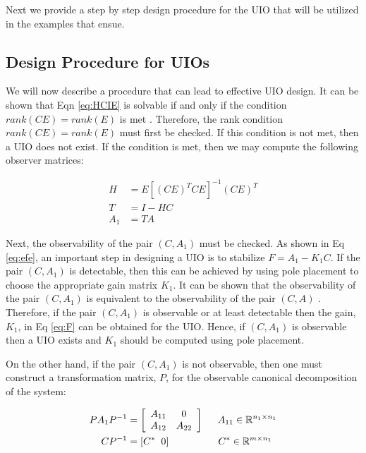 \documentclass{amsart}
\theoremstyle{definition}
\theoremstyle{remark}
\numberwithin{equation}{section}
\begin{document}
Next we provide a step by step design procedure for the UIO that will be utilized in the examples that ensue.
\subsection{Design Procedure for UIOs}
\label{sec: UIODesign}

We will now describe a procedure that can lead to effective UIO design.  It can be shown that Eqn \ref{eq:HCIE} is solvable if and only if the condition $rank(CE) = rank(E)$ is met \cite{Chen99}. Therefore, the rank condition  $rank(CE) = rank(E)$ must first be checked. If this condition is not met, then a UIO does not exist.  If the condition is met, then we may compute the following observer matrices:

\begin{center}
\begin{align*}
H   &= E[(CE)^T CE]^{-1} (CE)^T\\
T   &= I-HC \\
A_1 &= TA
\end{align*}
\end{center}
Next, the observability of the pair $(C,A_1)$ must be checked. As shown in Eq \ref{eq:efe}, an important step in designing a UIO is to stabilize $F=A_1-K_1 C$.  If the pair $(C,A_1)$ is detectable, then this can be achieved by using pole placement to choose the appropriate gain matrix $K_1$.  It can be shown that the observability of the pair $(C,A_1)$ is equivalent to the observability of the pair $(C,A)$ \cite{Sch12}. Therefore, if the pair $(C,A_1)$ is observable or at least detectable then the gain, $K_1$, in Eq \ref{eq:F} can be obtained for the UIO. Hence, if $(C,A_1)$ is observable then a UIO exists and $K_1$ should be computed using pole placement.
\vspace{3mm}

On the other hand, if the pair $(C, A_1)$ is not observable, then one must construct a transformation matrix, $P$, for the observable canonical decomposition of the system:

\begin{align*}
PA_1P^{-1} &=
\left [ \begin{array}{cc}
A_{11} & 0 \\
A_{12} & A_{22}
\end{array} \right ] \hspace{5mm} A_{11} \in \mathbb{R}^{n_1 \times n_1} \\
CP^{-1} &= \left [ C^* \hspace{2mm} 0 \right ] \hspace{17mm} C^* \in \mathbb{R}^{m \times n_1}
\end{align*}
\end{document}

